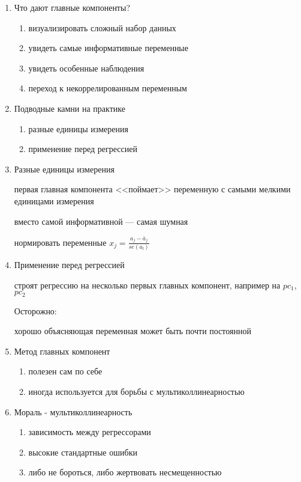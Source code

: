 \documentclass[12pt,a4paper]{article}
\begin{document}
{\begin{enumerate}
\item Что дают главные компоненты?

\begin{enumerate}
\item визуализировать сложный набор данных
\item увидеть самые информативные переменные
\item увидеть особенные наблюдения
\item переход к некоррелированным переменным
\end{enumerate}

\item Подводные камни на практике

\begin{enumerate}
\item разные единицы измерения 
\item применение перед регрессией
\end{enumerate}

\item Разные единицы измерения

первая главная компонента <<поймает>> переменную с самыми мелкими единицами измерения

вместо самой информативной --- самая шумная

нормировать переменные $x_j=\frac{a_j-\bar{a}_j}{se(a_l)}$

\item Применение перед регрессией

строят регрессию на несколько первых главных компонент, например на $pc_1$, $pc_2$

Осторожно: 

хорошо объясняющая переменная может быть почти постоянной

\item Метод главных компонент

\begin{enumerate}
\item полезен сам по себе 
\item иногда используется для борьбы с мультиколлинеарностью
\end{enumerate}

\item Мораль - мультиколлинеарность

\begin{enumerate}
\item зависимость между регрессорами

\item высокие стандартные ошибки

\item либо не бороться, либо жертвовать несмещенностью
\end{enumerate}


\end{enumerate}

} %
\end{document}
